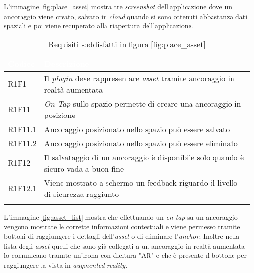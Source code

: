 L'immagine \ref{fig:place_asset} mostra tre \textit{screenshot} dell'applicazione dove un ancoraggio viene creato, salvato in \textit{cloud} quando si sono ottenuti abbastanza dati spaziali e poi viene recuperato alla riapertura dell'applicazione.

{
    \setlength{\freewidth}{\dimexpr\textwidth-10\tabcolsep}
    \renewcommand{\arraystretch}{1.5}
    \centering
    \setlength{\aboverulesep}{0pt}
    \setlength{\belowrulesep}{0pt}
    \begin{longtable}{C{.15\freewidth} C{.965\freewidth}}
       \toprule
    \textcolor{white}{\textbf{Codice}}&
    \textcolor{white}{\textbf{Descrizione}}\\
    \toprule
    \endhead

    R1F1 & Il \textit{plugin} deve rappresentare \textit{asset} tramite ancoraggio in realtà aumentata\\
    R1F11 & \textit{On-Tap} sullo spazio permette di creare una ancoraggio in posizione\\
    R1F11.1 & Ancoraggio posizionato nello spazio può essere salvato\\
    R1F11.2 & Ancoraggio posizionato nello spazio può essere eliminato\\
    R1F12 & Il salvataggio di un ancoraggio è disponibile solo quando è sicuro vada a buon fine\\
    R1F12.1 & Viene mostrato a schermo un feedback riguardo il livello di sicurezza raggiunto\\

    \bottomrule
    \caption{Requisiti soddisfatti in figura \ref{fig:place_asset}}
    \end{longtable}
}

L'immagine \ref{fig:asset_list} mostra che effettuando un \textit{on-tap} su un ancoraggio vengono mostrate le corrette informazioni contestuali e viene permesso tramite bottoni di raggiungere i dettagli dell'\textit{asset} o di eliminare l'\textit{anchor}. Inoltre nella lista degli \textit{asset} quelli che sono già collegati a un ancoraggio in realtà aumentata lo comunicano tramite un'icona con dicitura "AR" e che è presente il bottone per raggiungere la vista in \textit{augmented reality}.

